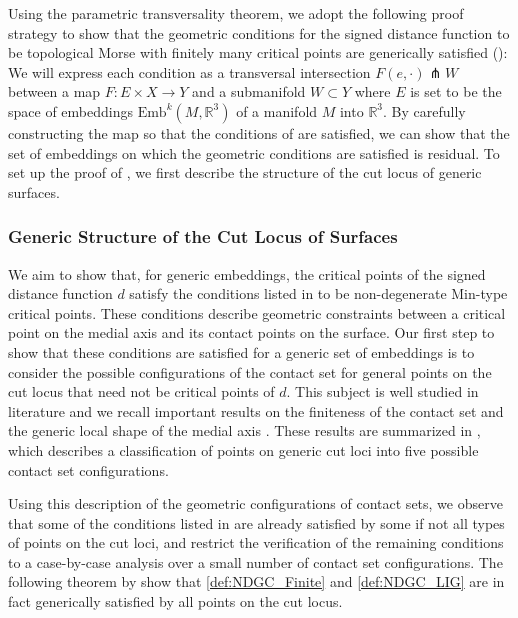 \documentclass[11pt]{article}
\newcommand{\R}{\mathbb{R}}
\newcommand{\Emb}{\mathrm{Emb}^k(M,\R^3)}
\theoremstyle{plain}
\theoremstyle{definition}
\theoremstyle{remark}
\begin{document}
	Using the parametric transversality theorem, we adopt the following proof strategy to show that the geometric conditions for the signed distance function to be topological Morse with finitely many critical points are generically satisfied (): We will express each condition as a transversal intersection $F(e, \cdot) \pitchfork W$ between a map $F: E \times X \to Y$ and a submanifold $W \subset Y$ where $E$ is set to be the space of embeddings $\Emb$ of a manifold $M$ into $\R^3$. By carefully constructing the map so that the conditions of  are satisfied, we can show that the set of embeddings on which the geometric conditions are satisfied is residual. To set up the proof of , we first describe the structure of the cut locus of generic surfaces. 
	
	\subsubsection{Generic Structure of the Cut Locus of Surfaces}
	
	We aim to show that, for generic embeddings, the critical points of the signed distance function $d$ satisfy the conditions listed in  to be non-degenerate Min-type critical points. These conditions describe geometric constraints between a critical point on the medial axis and its contact points on the surface. Our first step to show that these conditions are satisfied for a generic set of embeddings is to consider the possible configurations of the contact set for general points on the cut locus that need not be critical points of $d$. This subject is well studied in literature and we recall important results on the finiteness of the contact set and the generic local shape of the medial axis \citep{yomdin_local_1981, mather_distance_1983, giblin_symmetry_2000, cazals_differential_2005, damon_global_2006}. These results are summarized in , which describes a classification of points on generic cut loci into five possible contact set configurations. 
	
	Using this description of the geometric configurations of contact sets, we observe that some of the conditions listed in  are already satisfied by some if not all types of points on the cut loci, and restrict the verification of the remaining conditions to a case-by-case analysis over a small number of contact set configurations. The following theorem by \cite{yomdin_local_1981} show that \ref{def:NDGC_Finite} and \ref{def:NDGC_LIG} are in fact generically satisfied by all points on the cut locus. 
	
\end{document}
